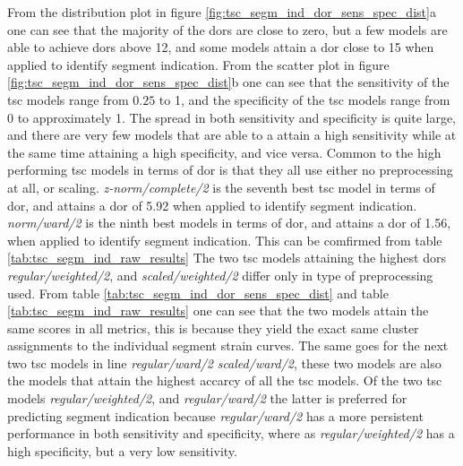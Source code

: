 From the distribution plot in figure \ref{fig:tsc_segm_ind_dor_sens_spec_dist}a one can see that the majority of the \acrshort{dor}s are close to zero, 
but a few models are able to achieve \acrshort{dor}s above 12, and some models attain a \acrshort{dor} close to 15 when applied to identify segment indication.
From the scatter plot in figure \ref{fig:tsc_segm_ind_dor_sens_spec_dist}b one can see that the sensitivity of the \acrshort{tsc} models range from $0.25$ to 1, 
and the specificity of the \acrshort{tsc} models range from 0 to approximately 1. 
The spread in both sensitivity and specificity is quite large, and there are very few models that are 
able to a attain a high sensitivity while at the same time attaining a high specificity, and vice versa. 
Common to the high performing \acrshort{tsc} models in terms of \acrshort{dor} is that they all use either no preprocessing at all, or scaling.
\textit{z-norm/complete/2} is the seventh best \acrshort{tsc} model in terms of \acrshort{dor}, and attains a \acrshort{dor} of 5.92 when applied to identify segment indication. 
\textit{norm/ward/2} is the ninth best models in terms of \acrshort{dor}, and attains a \acrshort{dor} of 1.56, when applied to identify segment indication.
This can be comfirmed from table \ref{tab:tsc_segm_ind_raw_results}
The two \acrshort{tsc} models attaining the highest \acrshort{dor}s \textit{regular/weighted/2}, and \textit{scaled/weighted/2} differ only in type of preprocessing used.
From table \ref{tab:tsc_segm_ind_dor_sens_spec_dist} and table \ref{tab:tsc_segm_ind_raw_results} one can see that the two models attain the same scores in all metrics,
this is because they yield the exact same cluster assignments to the individual segment strain curves.
The same goes for the next two \acrshort{tsc} models in line \textit{regular/ward/2} \textit{scaled/ward/2}, these two models are also the models that attain the highest accarcy of all the \acrshort{tsc} models.
Of the two \acrshort{tsc} models \textit{regular/weighted/2}, and \textit{regular/ward/2} the latter is preferred for predicting segment indication because \textit{regular/ward/2} has a more persistent
performance in both sensitivity and specificity, where as \textit{regular/weighted/2} has a high specificity, but a very low sensitivity.


